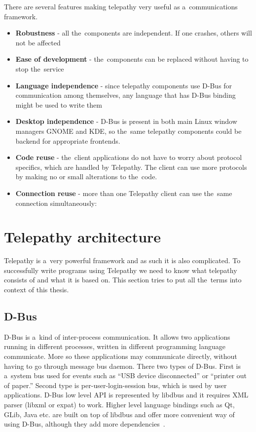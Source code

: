 There are several features making telepathy very useful as a~communications framework.

\begin{itemize}

	\item {\bf Robustness} - all the~components are independent. If one crashes, others will not be affected

	\item {\bf Ease of development} - the~components can be replaced without having to stop the~service 

	\item {\bf Language independence} - since telepathy components use D-Bus for communication among themselves, any language that has D-Bus binding might be used to write them

	\item {\bf Desktop independence} - D-Bus is present in both main Linux window managers GNOME and KDE, so the~same telepathy components could be backend for appropriate frontends.

	\item {\bf Code reuse} - the~client applications do not have to worry about protocol specifics, which are handled by Telepathy. The client can use more protocols by making no or small alterations to the~code.

	\item {\bf Connection reuse} - more than one Telepathy client can use the~same connection simultaneously:
\end{itemize}

\section{Telepathy architecture}
Telepathy is a~very powerful framework and as such it is also complicated. To successfully write programs using Telepathy we need to know what telepathy consists of and what it is based on. This section tries to put all the~terms into context of this thesis.  

\subsection*{D-Bus}
D-Bus is a~kind of inter-process communication. It allows two applications running in different processes, written in different programming language communicate. More so these applications may communicate directly, without having to go through message bus daemon. There two types of D-Bus. First is a~system bus used for events such as ``USB device disconnected'' or ``printer out of paper.'' Second type is per-user-login-session bus, which is used by user applications. D-Bus low level API is represented by libdbus and it requires XML parser (libxml or expat) to work. Higher level language bindings such as Qt, GLib, Java etc. are built on top of libdbus and offer more convenient way of using D-Bus, although they add more dependencies~\cite{dbus,TPWiki}.

